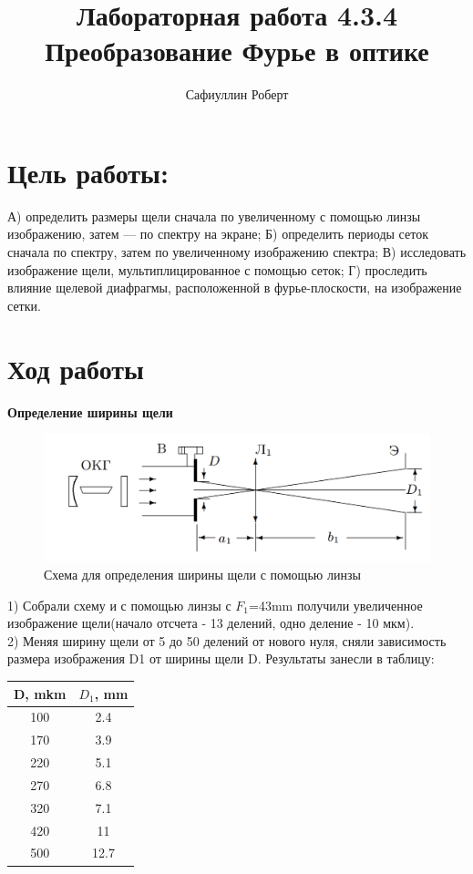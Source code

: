 \documentclass[a4paper,12pt]{article} %
\author{Сафиуллин Роберт	}
\title{Лабораторная работа  4.3.4\\ Преобразование Фурье в оптике}
\begin{document}

\maketitle


\newpage

\section{Цель работы:}
А) определить размеры щели сначала по
увеличенному с помощью линзы изображению, затем
— по спектру на экране; Б) определить периоды сеток сначала по спектру, затем по увеличенному изображению спектра; В) исследовать изображение щели, мультиплицированное с помощью сеток; Г) проследить влияние щелевой
диафрагмы, расположенной в фурье-плоскости, на изображение сетки.
\\


\section{Ход работы}

\textbf{Определение ширины щели}
\begin{figure}[H]
	\centering
	\includegraphics[width = 12 cm]{1.png}
	\caption{Схема для определения ширины щели с помощью линзы}
\end{figure}
 1) Собрали схему и с помощью линзы с $F_1$=43mm получили увеличенное изображение щели(начало отсчета - 13 делений, одно деление - 10 мкм). \\
 
 2) Меняя ширину щели от 5 до 50 делений от нового нуля,
сняли зависимость размера изображения D1 от ширины щели D. Результаты занесли в таблицу:\\
\begin{tabular}{|c|c|}
\hline 
D, mkm & $D_1$, mm \\ 
\hline 
100 & 2.4 \\ 
\hline 
170 & 3.9 \\ 
\hline 
220 & 5.1 \\ 
\hline 
270 & 6.8 \\ 
\hline 
320 & 7.1 \\ 
\hline 
420 & 11\\ 
\hline 
500 & 12.7 \\ 
\hline 
\end{tabular} 
 
\end{document}
